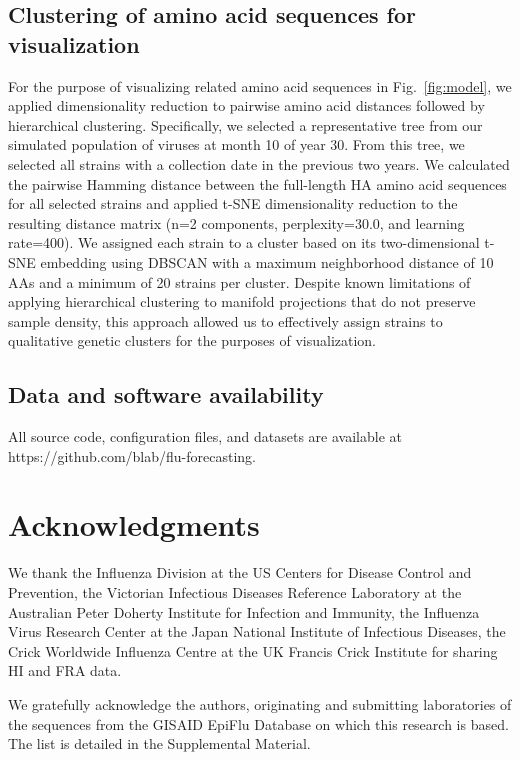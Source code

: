 \subsection*{Clustering of amino acid sequences for visualization}

For the purpose of visualizing related amino acid sequences in Fig.~\ref{fig:model}, we applied dimensionality reduction to pairwise amino acid distances followed by hierarchical clustering.
Specifically, we selected a representative tree from our simulated population of viruses at month 10 of year 30.
From this tree, we selected all strains with a collection date in the previous two years.
We calculated the pairwise Hamming distance between the full-length HA amino acid sequences for all selected strains and applied t-SNE dimensionality reduction \cite{vanDerMaaten2008} to the resulting distance matrix (n=2 components, perplexity=30.0, and learning rate=400).
We assigned each strain to a cluster based on its two-dimensional t-SNE embedding using DBSCAN \cite{Ester1996} with a maximum neighborhood distance of 10 AAs and a minimum of 20 strains per cluster.
Despite known limitations of applying hierarchical clustering to manifold projections that do not preserve sample density, this approach allowed us to effectively assign strains to qualitative genetic clusters for the purposes of visualization.

\subsection*{Data and software availability}

All source code, configuration files, and datasets are available at https://github.com/blab/flu-forecasting.

\section*{Acknowledgments}

We thank the Influenza Division at the US Centers for Disease Control and Prevention, the Victorian Infectious Diseases Reference Laboratory at the Australian Peter Doherty Institute for Infection and Immunity, the Influenza Virus Research Center at the Japan National Institute of Infectious Diseases, the Crick Worldwide Influenza Centre at the UK Francis Crick Institute for sharing HI and FRA data.

We gratefully acknowledge the authors, originating and submitting laboratories of the sequences from the GISAID EpiFlu Database \cite{shu2017gisaid} on which this research is based. The list is detailed in the Supplemental Material.

